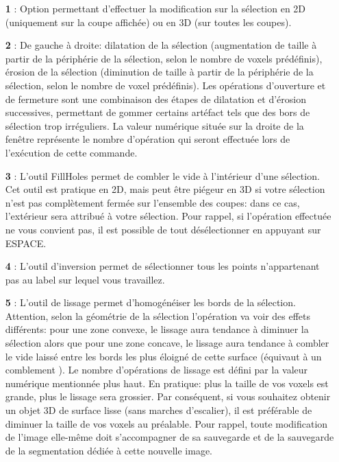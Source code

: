 \documentclass {article}
\begin{document}
\begin{itemize}
	\item[\textbf{1}]:	Option permettant d'effectuer la modification sur la sélection en 2D (uniquement sur la coupe affichée) ou en 3D (sur toutes les coupes). 
	\item[\textbf{2}]: De gauche à droite: dilatation de la sélection (augmentation de taille à partir de la périphérie de la sélection, selon le nombre de voxels prédéfinis), érosion de la sélection (diminution de taille à partir de la périphérie de la sélection, selon le nombre de voxel prédéfinis). Les opérations d'ouverture et de fermeture sont une combinaison des étapes de dilatation et d'érosion successives, permettant de gommer certains artéfact tels que des bors de sélection trop irréguliers. La valeur numérique située sur la droite de la fenêtre représente le nombre d'opération qui seront effectuée lors de l'exécution de cette commande.
	\item[\textbf{3}]: L'outil FillHoles permet de combler le vide à l'intérieur d'une sélection. Cet outil est pratique en 2D, mais peut être piégeur en 3D si votre sélection n'est pas complètement fermée sur l'ensemble des coupes: dans ce cas, \og l'extérieur \fg sera attribué à votre sélection. Pour rappel, si l'opération effectuée ne vous convient pas, il est possible de tout désélectionner en appuyant sur ESPACE.
	\item[\textbf{4}]: L'outil d'inversion permet de sélectionner tous les points n'appartenant pas au label sur lequel vous travaillez.
	\item[\textbf{5}]: L'outil de lissage permet d'homogénéiser les bords de la sélection. Attention, selon la géométrie de la sélection l'opération va voir des effets différents: pour une zone convexe, le lissage aura tendance à diminuer la sélection alors que pour une zone concave, le lissage aura tendance à combler le vide laissé entre les bords les plus éloigné de cette surface (équivaut à un \og comblement \fg). Le nombre d'opérations de lissage est défini par la valeur numérique mentionnée plus haut. En pratique: plus la taille de vos voxels est grande, plus le lissage sera grossier. Par conséquent, si vous souhaitez obtenir un objet 3D de surface lisse (sans marches d'escalier), il est préférable de diminuer la taille de vos voxels au préalable. Pour rappel, toute modification de l'image elle-même doit s'accompagner de sa sauvegarde et de la sauvegarde de la segmentation dédiée à cette nouvelle image.
	
\end{itemize}
\end{document}
